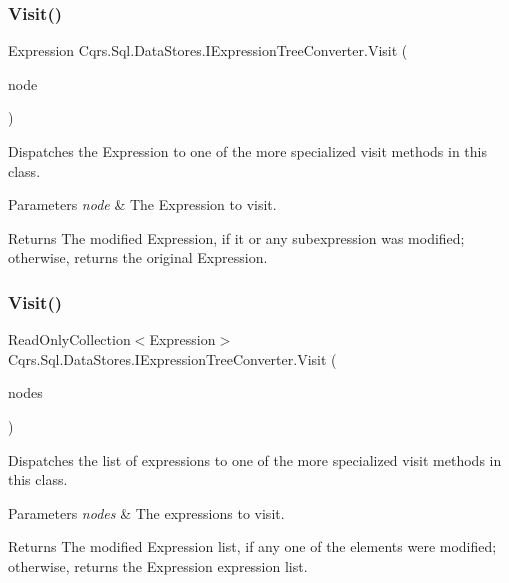 \subsubsection{\texorpdfstring{Visit()}{Visit()}\hspace{0.1cm}{\footnotesize\ttfamily [1/2]}}
{\footnotesize\ttfamily Expression Cqrs.\+Sql.\+Data\+Stores.\+I\+Expression\+Tree\+Converter.\+Visit (\begin{DoxyParamCaption}\item[{Expression}]{node }\end{DoxyParamCaption})}



Dispatches the Expression to one of the more specialized visit methods in this class. 


\begin{DoxyParams}{Parameters}
{\em node} & The Expression to visit.\\
\hline
\end{DoxyParams}
\begin{DoxyReturn}{Returns}
The modified Expression, if it or any subexpression was modified; otherwise, returns the original Expression.
\end{DoxyReturn}
\mbox{\label{interfaceCqrs_1_1Sql_1_1DataStores_1_1IExpressionTreeConverter_a24431bb6665d6d9b617f244049190655_a24431bb6665d6d9b617f244049190655}} 
\subsubsection{\texorpdfstring{Visit()}{Visit()}\hspace{0.1cm}{\footnotesize\ttfamily [2/2]}}
{\footnotesize\ttfamily Read\+Only\+Collection$<$Expression$>$ Cqrs.\+Sql.\+Data\+Stores.\+I\+Expression\+Tree\+Converter.\+Visit (\begin{DoxyParamCaption}\item[{Read\+Only\+Collection$<$ Expression $>$}]{nodes }\end{DoxyParamCaption})}



Dispatches the list of expressions to one of the more specialized visit methods in this class. 


\begin{DoxyParams}{Parameters}
{\em nodes} & The expressions to visit.\\
\hline
\end{DoxyParams}
\begin{DoxyReturn}{Returns}
The modified Expression list, if any one of the elements were modified; otherwise, returns the Expression expression list.
\end{DoxyReturn}
